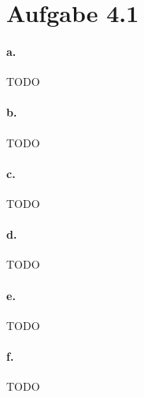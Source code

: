 \documentclass{article}
\begin{document}
	
	
	
	
	
	\section*{Aufgabe 4.1}
		\paragraph*{a.}
			TODO
			
		\paragraph*{b.}
			TODO
			
		\paragraph*{c.}
			TODO
			
		\paragraph*{d.}
			TODO
		
		\paragraph*{e.}
			TODO
		
		\paragraph*{f.}
			TODO
	
\end{document}
